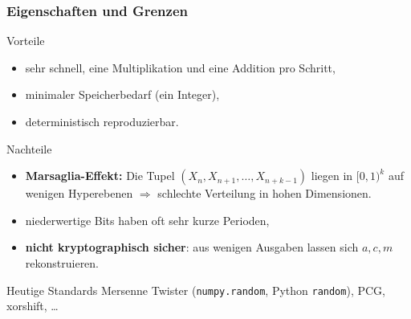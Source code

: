 \documentclass{beamer}
\begin{document}
\begin{frame}
    \frametitle{Eigenschaften und Grenzen}

\begin{block}{Vorteile}
\begin{itemize}
    \item sehr schnell, eine Multiplikation und eine Addition pro Schritt,
    \item minimaler Speicherbedarf (ein Integer),
    \item deterministisch reproduzierbar.
\end{itemize}
\end{block}

\begin{block}{Nachteile}
\begin{itemize}
    \item \textbf{Marsaglia-Effekt:} Die Tupel
          $(X_n, X_{n+1}, \ldots, X_{n+k-1})$ liegen in $[0,1)^k$ auf
          wenigen Hyperebenen $\Rightarrow$ schlechte Verteilung in
          hohen Dimensionen.
    \item niederwertige Bits haben oft sehr kurze Perioden,
    \item \textbf{nicht kryptographisch sicher}: aus wenigen Ausgaben
          lassen sich $a, c, m$ rekonstruieren.
\end{itemize}
\end{block}

\begin{block}{Heutige Standards}
Mersenne Twister (\texttt{numpy.random}, Python \texttt{random}),
PCG, xorshift, \ldots
\end{block}

\end{frame}
\end{document}
